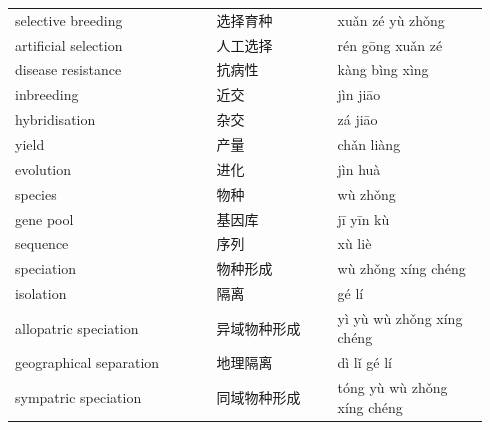\documentclass[11pt]{article}
\begin{document}
\begin{longtable}{@{}p{0.40\linewidth}p{0.24\linewidth}p{0.30\linewidth}@{}}
selective breeding & 选择育种 & xuǎn zé yù zhǒng \\
artificial selection & 人工选择 & rén gōng xuǎn zé \\
disease resistance & 抗病性 & kàng bìng xìng \\
inbreeding & 近交 & jìn jiāo \\
hybridisation & 杂交 & zá jiāo \\
yield & 产量 & chǎn liàng \\
evolution & 进化 & jìn huà \\
species & 物种 & wù zhǒng \\
gene pool & 基因库 & jī yīn kù \\
sequence & 序列 & xù liè \\
speciation & 物种形成 & wù zhǒng xíng chéng \\
isolation & 隔离 & gé lí \\
allopatric speciation & 异域物种形成 & yì yù wù zhǒng xíng chéng \\
geographical separation & 地理隔离 & dì lǐ gé lí \\
sympatric speciation & 同域物种形成 & tóng yù wù zhǒng xíng chéng \\
\end{longtable}
\end{document}
